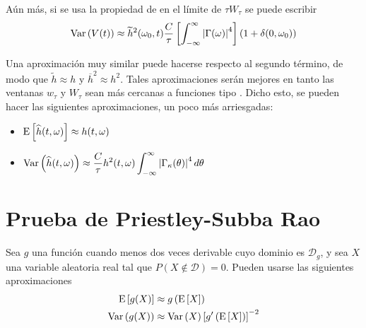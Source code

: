 Aún más, si se usa la propiedad de en el límite de $\tau W_\tau$ se puede escribir
\begin{equation}
\mathrm{Var}\left( V(t) \right) \approx 
\widetilde{h}^{2}(\omega_0,t) \frac{C}{\tau} \left[ \int_{-\infty}^{\infty} \left| \Gamma(\omega) \right|^{4} \right] (1+\delta(0,\omega_0))
\end{equation}

Una aproximación muy similar 
puede hacerse respecto al segundo término, de modo que $\widetilde{h}\approx h$ y 
$\overline{h}^{2}\approx h^{2}$.
Tales aproximaciones serán mejores en tanto las ventanas $w_{\tau}$ y $W_{\tau}$ sean más 
cercanas a funciones tipo \dirac.
Dicho esto, se pueden hacer las siguientes aproximaciones, un poco más arriesgadas:
\begin{itemize}
\item $\displaystyle \mathrm{E}\left[ \widehat{ h }(t,\omega) \right] \approx h(t,\omega)$
\item $\displaystyle \mathrm{Var}\left( \widehat{ h }(t,\omega) \right) \approx 
\frac{C}{\tau} h^{2}(t,\omega) \int_{-\infty}^{\infty} \left| \Gamma_\kappa (\theta) \right|^{4} d\theta$
\end{itemize}


\section{Prueba de Priestley-Subba Rao}
\label{sec:psr}

\begin{proposicion}
Sea $g$ una función cuando menos dos veces derivable cuyo dominio es $\mathcal{D}_g$, y sea $X$ una variable aleatoria real tal que $P(X\notin \mathcal{D}) = 0$. 
Pueden usarse las siguientes aproximaciones
\begin{align}
\mathrm{E}\left[ g(X) \right] &\approx g\left( \mathrm{E}\left[ X \right] \right) \\
\mathrm{Var}\left( g(X) \right) &\approx \mathrm{Var}\left( X \right) \left[ g^{\prime} \left( \mathrm{E}\left[ X \right] \right) \right]^{-2}
\end{align}
\end{proposicion}

